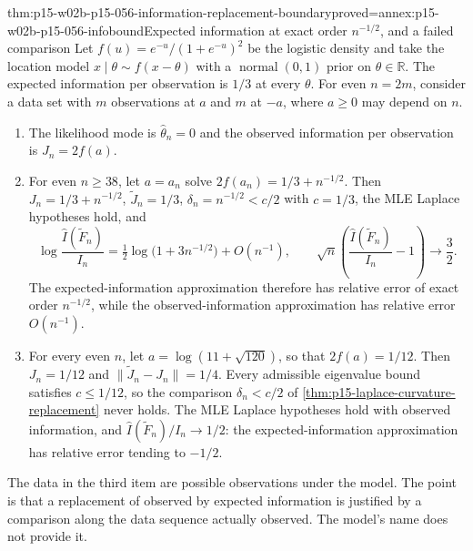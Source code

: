\begin{hbtheorem}{thm:p15-w02b-p15-056-information-replacement-boundary}{proved=annex:p15-w02b-p15-056-infobound}{Expected information at exact order \(n^{-1/2}\), and a failed comparison}
Let \(f(u)=e^{-u}/(1+e^{-u})^2\) be the logistic density and take the
location model \(x\mid\theta\sim f(x-\theta)\) with a
\(\operatorname{normal}(0,1)\) prior on \(\theta\in\mathbb R\). The
expected information per observation is \(1/3\) at every \(\theta\).
For even \(n=2m\), consider a data set with \(m\) observations at
\(a\) and \(m\) at \(-a\), where \(a\geq0\) may depend on \(n\).
\begin{enumerate}
\item The likelihood mode is \(\widehat\theta_n=0\) and the observed
information per observation is \(J_n=2f(a)\).
\item For even \(n\geq38\), let \(a=a_n\) solve
\(2f(a_n)=1/3+n^{-1/2}\). Then \(J_n=1/3+n^{-1/2}\),
\(\widetilde J_n=1/3\), \(\delta_n=n^{-1/2}<c/2\) with \(c=1/3\), the
MLE Laplace hypotheses hold, and
\[
 \log\frac{\widehat I(\widetilde F_n)}{I_n}
 =\tfrac12\log\bigl(1+3n^{-1/2}\bigr)+O(n^{-1}),
 \qquad
 \sqrt n\left(\frac{\widehat I(\widetilde F_n)}{I_n}-1\right)\to\frac32 .
\]
The expected-information approximation therefore has relative error of
exact order \(n^{-1/2}\), while the observed-information approximation
has relative error \(O(n^{-1})\).
\item For every even \(n\), let \(a=\log(11+\sqrt{120})\), so that
\(2f(a)=1/12\). Then \(J_n=1/12\) and \(\|\widetilde J_n-J_n\|=1/4\).
Every admissible eigenvalue bound satisfies \(c\leq1/12\), so the
comparison \(\delta_n<c/2\) of \cref{thm:p15-laplace-curvature-replacement}
never holds. The MLE Laplace hypotheses hold with observed information,
and \(\widehat I(\widetilde F_n)/I_n\to1/2\): the expected-information
approximation has relative error tending to \(-1/2\).
\end{enumerate}
\end{hbtheorem}

The data in the third item are possible observations under the model.
The point is that a replacement of observed by expected information is
justified by a comparison along the data sequence actually observed. The
model's name does not provide it.

